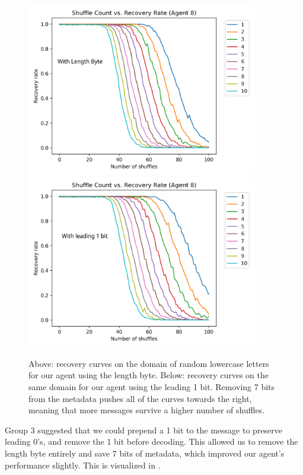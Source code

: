 \documentclass[titlepage]{article}
\begin{document}
\begin{figure}[H]
    \centering
    \includegraphics[width=0.9\textwidth]{figures/length_byte.png}
    \includegraphics[width=0.9\textwidth]{figures/leading_1.png}
    \caption{Above: recovery curves on the domain of random lowercase letters for our agent using the length byte. Below: recovery curves on the same domain for our agent using the leading 1 bit. Removing 7 bits from the metadata pushes all of the curves towards the right, meaning that more messages survive a higher number of shuffles.}
    \label{fig:no_length_byte}
\end{figure}

Group 3 suggested that we could prepend a 1 bit to the message to preserve leading 0's, and remove the 1 bit before decoding. This allowed us to remove the length byte entirely and save 7 bits of metadata, which improved our agent's performance slightly. This is visualized in .
\end{document}

